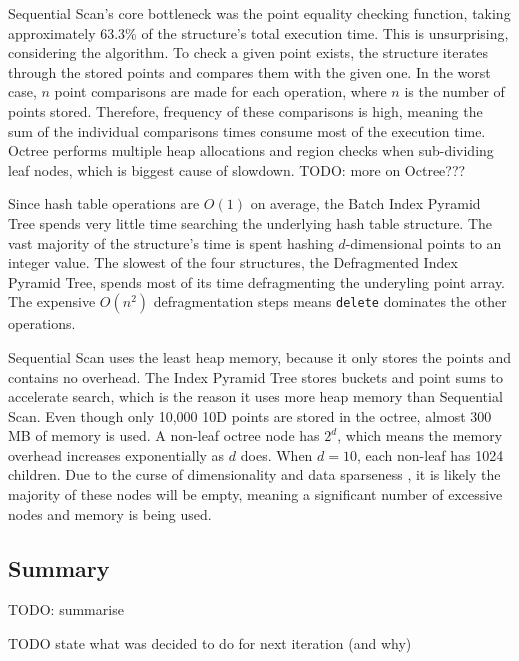 Sequential Scan's core bottleneck was the point equality checking function, taking approximately 63.3\% of the structure's total execution time. This is unsurprising, considering the algorithm. To check a given point exists, the structure iterates through the stored points and compares them with the given one. In the worst case, $n$ point comparisons are made for each operation, where $n$ is the number of points stored. Therefore, frequency of these comparisons is high, meaning the sum of the individual comparisons times consume most of the execution time. Octree performs multiple heap allocations and region checks when sub-dividing leaf nodes, which is biggest cause of slowdown. TODO: more on Octree???

Since hash table operations are $O(1)$ on average, the Batch Index Pyramid Tree spends very little time searching the underlying hash table structure. The vast majority of the structure's time is spent hashing $d$-dimensional points to an integer value. The slowest of the four structures, the Defragmented Index Pyramid Tree, spends most of its time defragmenting the underyling point array. The expensive $O(n^2)$ defragmentation steps means \texttt{delete} dominates the other operations.

Sequential Scan uses the least heap memory, because it only stores the points and contains no overhead. The Index Pyramid Tree stores buckets and point sums to accelerate search, which is the reason it uses more heap memory than Sequential Scan. Even though only 10,000 10D points are stored in the octree, almost 300 MB of memory is used. A non-leaf octree node has $2^d$, which means the memory overhead increases exponentially as $d$ does. When $d = 10$, each non-leaf has 1024 children. Due to the curse of dimensionality and data sparseness \cite{data-sparseness}, it is likely the majority of these nodes will be empty, meaning a significant number of excessive nodes and memory is being used.

\subsection{Summary}

TODO: summarise 

TODO state what was decided to do for next iteration (and why)
